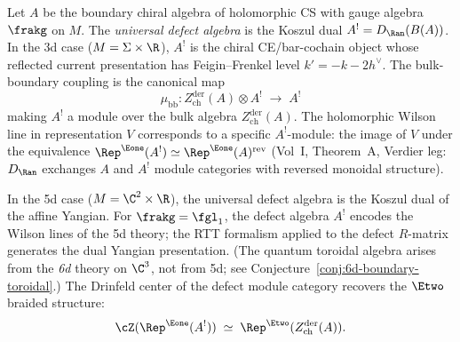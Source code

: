 \begin{construction}
\label{constr:universal-defect}
Let $A$ be the boundary chiral algebra of holomorphic CS with gauge algebra $\frakg$ on $M$. The \emph{universal defect algebra} is the Koszul dual $A^! = D_{\Ran}(B(A))$. In the 3d case ($M = \Sigma \times \R$), $A^!$ is the chiral CE/bar-cochain object whose reflected current presentation has Feigin--Frenkel level $k' = -k - 2h^\vee$. The bulk-boundary coupling is the canonical map
\[
 \mu_{\mathrm{bb}} \colon Z^{\mathrm{der}}_{\mathrm{ch}}(A) \otimes A^! \;\longrightarrow\; A^!
\]
making $A^!$ a module over the bulk algebra $Z^{\mathrm{der}}_{\mathrm{ch}}(A)$. The holomorphic Wilson line in representation $V$ corresponds to a specific $A^!$-module: the image of $V$ under the equivalence $\Rep^{\Eone}(A^!) \simeq \Rep^{\Eone}(A)^{\mathrm{rev}}$ (Vol~I, Theorem~A, Verdier leg: $D_{\Ran}$ exchanges $A$ and $A^!$ module categories with reversed monoidal structure).

In the 5d case ($M = \C^2 \times \R$), the universal defect algebra is the Koszul dual of the affine Yangian. For $\frakg = \fgl_1$, the defect algebra $A^!$ encodes the Wilson lines of the 5d theory; the RTT formalism applied to the defect $R$-matrix generates the dual Yangian presentation. (The quantum toroidal algebra arises from the \emph{6d} theory on $\C^3$, not from 5d; see Conjecture~\ref{conj:6d-boundary-toroidal}.) The Drinfeld center of the defect module category recovers the $\Etwo$ braided structure:
\[
 \cZ(\Rep^{\Eone}(A^!)) \;\simeq\; \Rep^{\Etwo}(Z^{\mathrm{der}}_{\mathrm{ch}}(A)).
\]
\end{construction}

